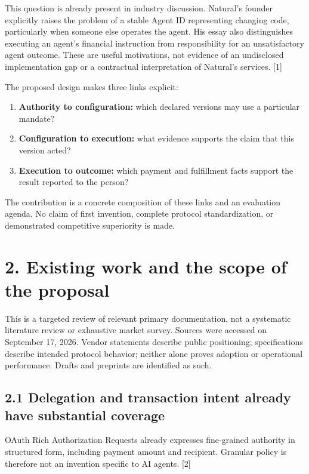 \documentclass[
  11pt,
  letterpaper,
]{article}
\providecommand{\tightlist}{%
  \setlength{\itemsep}{0pt}\setlength{\parskip}{0pt}}
\begin{document}
This question is already present in industry discussion. Natural's
founder explicitly raises the problem of a stable Agent ID representing
changing code, particularly when someone else operates the agent. His
essay also distinguishes executing an agent's financial instruction from
responsibility for an unsatisfactory agent outcome. These are useful
motivations, not evidence of an undisclosed implementation gap or a
contractual interpretation of Natural's services. {[}1{]}

The proposed design makes three links explicit:

\begin{enumerate}
\def\labelenumi{\arabic{enumi}.}
\tightlist
\item
  \textbf{Authority to configuration:} which declared versions may use a
  particular mandate?
\item
  \textbf{Configuration to execution:} what evidence supports the claim
  that this version acted?
\item
  \textbf{Execution to outcome:} which payment and fulfillment facts
  support the result reported to the person?
\end{enumerate}

The contribution is a concrete composition of these links and an
evaluation agenda. No claim of first invention, complete protocol
standardization, or demonstrated competitive superiority is made.

\section{2. Existing work and the scope of the
proposal}\label{existing-work-and-the-scope-of-the-proposal}

This is a targeted review of relevant primary documentation, not a
systematic literature review or exhaustive market survey. Sources were
accessed on September 17, 2026. Vendor statements describe public
positioning; specifications describe intended protocol behavior; neither
alone proves adoption or operational performance. Drafts and preprints
are identified as such.

\subsection{2.1 Delegation and transaction intent already have
substantial
coverage}\label{delegation-and-transaction-intent-already-have-substantial-coverage}

OAuth Rich Authorization Requests already expresses fine-grained
authority in structured form, including payment amount and recipient.
Granular policy is therefore not an invention specific to AI agents.
{[}2{]}
\end{document}
